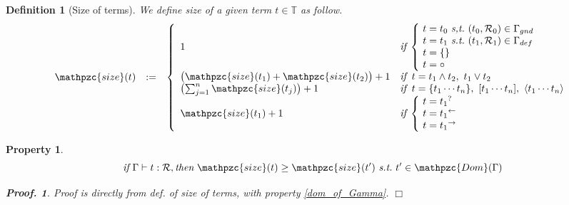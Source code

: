 \documentclass[12pt]{article}
\newtheorem{Definition}{Definition}[section]
\newtheorem{Property}{Property}[section]
\newtheorem{Proof}{Proof.}
\begin{document}
\begin{Definition}[Size of terms]
  We define size of a given term $t \in \mathbb{T}$ as follow.
  \begin{displaymath}
    \begin{array}{lll}
      \mathpzc{size}(t) &:=
      & \left\{ \begin{array}{ll}
          1  & \text{\it if}\;
                \left\{ \! \begin{array}{l}
                  t = t_0\ \text{\it s,t.}\
                   (t_0, \mathcal{R}_0) \in \Gamma_{gnd}  \\
                  t = t_1\ \text{\it s.t.}\
                   (t_1, \mathcal{R}_1) \in \Gamma_{def}  \\
                  t = \{\}  \\
                  t = \circ
                \end{array} \right.  \\
          \bigl(\mathpzc{size}(t_1) + \mathpzc{size}(t_2) \bigr) + 1  &
           \text{\it if}\;\; t = t_1 \wedge t_2,\ t_1 \vee t_2  \\
          \bigl(\sum_{j=1}^{n} \mathpzc{size}(t_j) \bigr) + 1  &
           \text{\it if}\;\; t = \{t_1 \cdots t_n \},
            \ [t_1 \cdots t_n ], \ \langle t_1 \cdots t_n \rangle  \\
          \mathpzc{size}(t_1) + 1  &
           \text{\it if}\; \left\{ \! \begin{array}{l}
             t = {t_1}^?  \\
             t = {t_1}^\leftarrow \\
             t = {t_1}^\rightarrow
           \end{array} \right.
        \end{array} \right.
    \end{array}
  \end{displaymath}
\end{Definition}


\begin{Property}
  \label{termsize_constraint_on_Gamma}
  \[ \text{\it if}\ \Gamma \vdash t : \mathcal{R}, \text{\it then}\
      \mathpzc{size}(t) \ge \mathpzc{size}(t')\ \text{\it s.t.}\
       t' \in \mathpzc{Dom}(\Gamma)
  \]
  \begin{Proof}
    Proof is directly from def. of size of terms, with property
    \ref{dom_of_Gamma}.
    $\Box$
  \end{Proof}
\end{Property}
\end{document}
